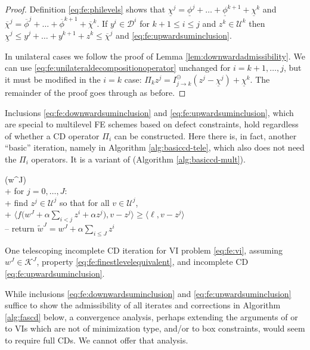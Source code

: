 \documentclass[letterpaper,final,12pt,reqno]{amsart}
\theoremstyle{cstyle}
\theoremstyle{cstyle*}
\theoremstyle{dstyle}
\numberwithin{equation}{section}
\numberwithin{figure}{section}
\numberwithin{table}{section}
\numberwithin{theorem}{section}
\newcommand{\ip}[2]{\langle#1,#2\rangle}
\begin{document}
\begin{proof}  Definition \eqref{eq:fe:philevels} shows that $\underline{\chi}^j = \underline{\phi}^j + \dots + \underline{\phi}^{k+1} + \underline{\chi}^k$ and $\overline{\chi}^j = \overline{\phi}^j + \dots + \overline{\phi}^{k+1} + \overline{\chi}^k$.  If $y^i \in \mathcal{D}^i$ for $k+1 \le i \le j$ and $z^k \in \mathcal{U}^k$ then $\underline{\chi}^j \le y^j + \dots + y^{k+1} + z^k \le \overline{\chi}^j$ and \eqref{eq:fe:upwardsuminclusion}.

In unilateral cases we follow the proof of Lemma \ref{lem:downwardadmissibility}.  We can use \eqref{eq:fe:unilateraldecompositionoperator} unchanged for $i=k+1,\dots,j$, but it must be modified in the $i=k$ case: $\Pi_k z^j = I_{j\to k}^\ominus(z^j - \underline{\chi}^j) + \underline{\chi}^k$.  The remainder of the proof goes through as before.
\end{proof}

Inclusions \eqref{eq:fe:downwardsuminclusion} and \eqref{eq:fe:upwardsuminclusion}, which are special to multilevel FE schemes based on defect constraints, hold regardless of whether a CD operator $\Pi_i$ can be constructed.  Here there is, in fact, another ``basic'' iteration, namely  in Algorithm \ref{alg:basiccd-tele}, which also does not need the $\Pi_i$ operators.  It is a variant of  (Algorithm \ref{alg:basiccd-mult}).

\begin{pseudofloat}[ht]
\begin{pseudo*}
(w^J)\text{:} \\+
    for $j = 0,\dots,J$: \\+
        \rm{find} $z^j\in \mathcal{U}^j$ \rm{so that for all} $v \in \mathcal{U}^j$, \\+
            $\displaystyle \ip{f\Big(w^J + \alpha \sum_{i<j} z^i + \alpha z^j\Big)}{v-z^j} \ge \ip{\ell}{v-z^j}$ \\--
    return $\tilde w^J=w^J + \alpha \sum_{i\le J} z^i$
\end{pseudo*}
\caption{One telescoping incomplete CD iteration for VI problem \eqref{eq:fe:vi}, assuming $w^J\in\mathcal{K}^J$, property \eqref{eq:fe:finestlevelequivalent}, and incomplete CD \eqref{eq:fe:upwardsuminclusion}.}
\label{alg:basiccd-tele}
\end{pseudofloat}

While inclusions \eqref{eq:fe:downwardsuminclusion} and \eqref{eq:fe:upwardsuminclusion} suffice to show the admissibility of all iterates and corrections in Algorithm \ref{alg:fascd} below, a convergence analysis, perhaps extending the arguments of \cite{Tai2003} or \cite{GraeserKornhuber2009} to VIs which are not of minimization type, and/or to box constraints, would seem to require full CDs.  We cannot offer that analysis.
\end{document}
